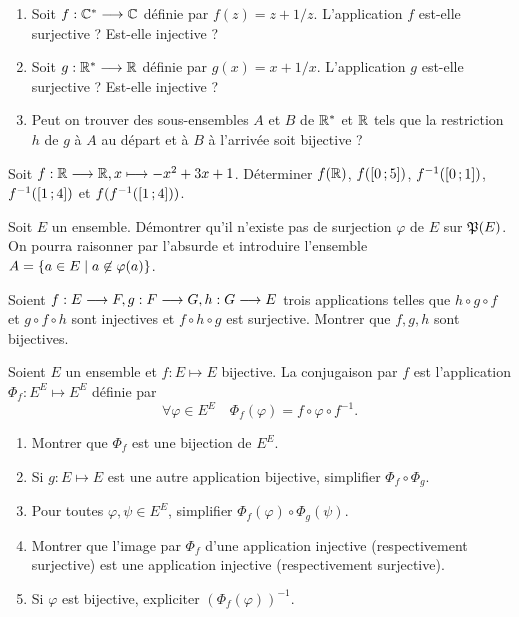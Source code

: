 \begin{exercice}
    \begin{enumerate}
        \item Soit \(f : \mathbb{C}^* \longrightarrow \mathbb{C}\) définie par \(f(z)=z+1/z\). L'application \(f\) est-elle surjective ? Est-elle injective ?
        \item Soit \(g : \mathbb{R}^* \longrightarrow \mathbb{R}\) définie par \(g(x)=x+1/x\). L'application \(g\) est-elle surjective ? Est-elle injective ?
        \item Peut on trouver des sous-ensembles \(A\) et \(B\) de \(\mathbb{R}^*\) et \(\mathbb{R}\) tels que la restriction \(h\) de \(g\) à \(A\) au départ et à \(B\) à l'arrivée soit bijective ?
    \end{enumerate}
\end{exercice}
\begin{exercice}
    Soit \(f:\mathbb{R} \longrightarrow \mathbb{R}, x \longmapsto -x^2+3x+1\). Déterminer \(f(\mathbb{R})\), \(f(\left[ 0 \, ;  5 \right])\), \(f^{-1}(\left[ 0 \, ;  1 \right])\), \(f^{-1}(\left[ 1 \, ;  4 \right])\) et \(f(f^{-1}(\left[ 1 \, ;  4 \right]))\).
\end{exercice}
\begin{exercice}
    Soit \(E\) un ensemble. Démontrer qu'il n'existe pas de surjection \(\varphi\) de \(E\) sur \(\mathfrak{P}(E)\). On pourra raisonner par l'absurde et introduire l'ensemble \(A=\left\{a \in E\mathrel{}\middle|\mathrel{}a \not\in \varphi(a)\right\}\).
\end{exercice}
\begin{exercice}
    Soient \(f:E \longrightarrow F, g:F \longrightarrow G, h:G \longrightarrow E\) trois applications telles que \(h \circ g \circ f\) et \(g \circ f \circ h\) sont injectives et \(f \circ h \circ g\) est surjective. Montrer que \(f, g, h\) sont bijectives.
\end{exercice}
\begin{exercice}[Conjugaison]
    Soient \(E\) un ensemble et \(f : E \longmapsto E\) bijective. La conjugaison par \(f\) est l'application \(\Phi_f : E^E \longmapsto E^E\) définie par
    \begin{equation}
        \forall \varphi \in E^E \quad \Phi_f(\varphi) = f \circ \varphi \circ f^{-1}.
    \end{equation}
    \begin{enumerate}
        \item Montrer que \(\Phi_f\) est une bijection de \(E^E\).
        \item Si \(g : E \longmapsto E\) est une autre application bijective, simplifier \(\Phi_f \circ \Phi_g\).
        \item Pour toutes \(\varphi, \psi \in E^E\), simplifier  \(\Phi_f(\varphi) \circ \Phi_g(\psi)\).
        \item Montrer que l'image par \(\Phi_f\) d'une application injective (respectivement surjective) est une application injective (respectivement surjective).
        \item Si \(\varphi\) est bijective, expliciter \((\Phi_f(\varphi))^{-1}\).
    \end{enumerate}
\end{exercice}
